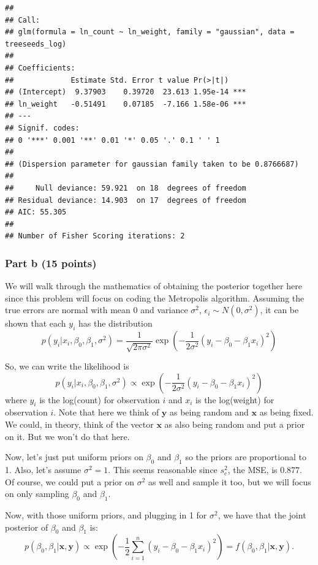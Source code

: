 \documentclass[
]{article}
\begin{document}
\begin{verbatim}
## 
## Call:
## glm(formula = ln_count ~ ln_weight, family = "gaussian", data = treeseeds_log)
## 
## Coefficients:
##             Estimate Std. Error t value Pr(>|t|)    
## (Intercept)  9.37903    0.39720  23.613 1.95e-14 ***
## ln_weight   -0.51491    0.07185  -7.166 1.58e-06 ***
## ---
## Signif. codes:  
## 0 '***' 0.001 '**' 0.01 '*' 0.05 '.' 0.1 ' ' 1
## 
## (Dispersion parameter for gaussian family taken to be 0.8766687)
## 
##     Null deviance: 59.921  on 18  degrees of freedom
## Residual deviance: 14.903  on 17  degrees of freedom
## AIC: 55.305
## 
## Number of Fisher Scoring iterations: 2
\end{verbatim}

\hypertarget{part-b-15-points}{%
\subsubsection{Part b (15 points)}\label{part-b-15-points}}

We will walk through the mathematics of obtaining the posterior together
here since this problem will focus on coding the Metropolis algorithm.
Assuming the true errors are normal with mean 0 and variance
\(\sigma^2\), \(\epsilon_i\sim N(0,\sigma^2)\), it can be shown that
each \(y_i\) has the distribution \[
p(y_i|x_i,\beta_0,\beta_1,\sigma^2) = \frac{1}{\sqrt{2\pi\sigma^2}}\exp\left(
-\frac{1}{2\sigma^2}(y_i-\beta_0-\beta_1x_i)^2\right)
\]

So, we can write the likelihood is \[
p(y_i|x_i,\beta_0,\beta_1,\sigma^2) \propto\exp\left(
-\frac{1}{2\sigma^2}(y_i-\beta_0-\beta_1x_i)^2\right)
\] where \(y_i\) is the log(count) for observation \(i\) and \(x_i\) is
the log(weight) for observation \(i\). Note that here we think of
\(\boldsymbol{y}\) as being random and \(\boldsymbol{x}\) as being
fixed. We could, in theory, think of the vector \(\boldsymbol{x}\) as
also being random and put a prior on it. But we won't do that here.

Now, let's just put uniform priors on \(\beta_0\) and \(\beta_1\) so the
priors are proportional to 1. Also, let's assume \(\sigma^2=1\). This
seems reasonable since \(s_e^2\), the MSE, is 0.877. Of course, we could
put a prior on \(\sigma^2\) as well and sample it too, but we will focus
on only sampling \(\beta_0\) and \(\beta_1\).

Now, with those uniform priors, and plugging in 1 for \(\sigma^2\), we
have that the joint posterior of \(\beta_0\) and \(\beta_1\) is: \[
p(\beta_0,\beta_1|\boldsymbol{x},\boldsymbol{y}) \propto\exp\left(
-\frac{1}{2}\sum_{i=1}^n(y_i-\beta_0-\beta_1x_i)^2\right)=f(\beta_0,\beta_1|\boldsymbol{x},\boldsymbol{y}).
\]
\end{document}
